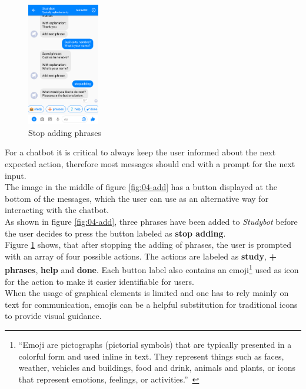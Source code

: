\begin{figure}
  \centering
  \includegraphics[width=0.28\textwidth]{images/interface/05-stop-adding.png}
	\caption{Stop adding phrases}
	\label{fig:05-stop-adding}
\end{figure}

For a chatbot it is critical to always keep the user informed about the next expected action,
therefore most messages should end with a prompt for the next input.
\\

The image in the middle of figure \ref{fig:04-add} has a button displayed at the bottom of the messages,
which the user can use as an alternative way for interacting with the chatbot.
\\

As shown in figure \ref{fig:04-add}, three phrases have been added to \emph{Studybot}
before the user decides to press the button labeled as \textbf{stop adding}.
\\
Figure \ref{fig:05-stop-adding} shows, that after stopping the adding of phrases, the user is prompted with an array of four possible actions.
The actions are labeled as \textbf{study}, \textbf{+ phrases}, \textbf{help} and \textbf{done}.
Each button label also contains an emoji\footnote{``Emoji are pictographs (pictorial symbols) that are typically presented in a colorful form and used inline in text. They represent things such as faces, weather, vehicles and buildings, food and drink, animals and plants, or icons that represent emotions, feelings, or activities.''~\cite{emoji}} used as icon for the action to make it easier identifiable for users.
\\
When the usage of graphical elements is limited and one has to rely mainly on text for communication,
emojis can be a helpful substitution for traditional icons to provide visual guidance.
\\


